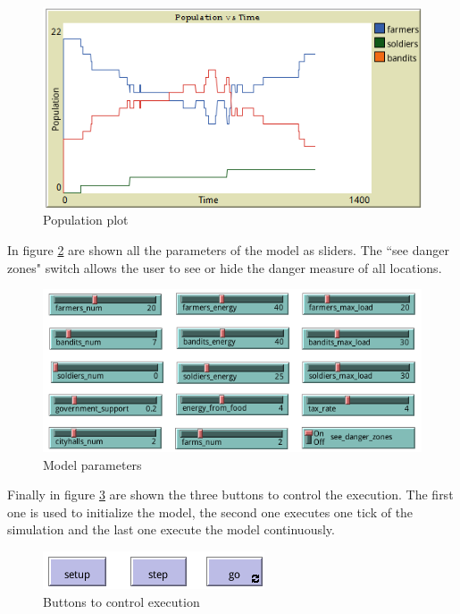 \documentclass{wscpaperproc}
\begin{document}
\begin{figure}[h!]
    \centering
    \includegraphics[scale=0.5]{Images/Population1}
    \caption{Population plot}
    \label{imp:population_plot1}
\end{figure}

In figure \ref{imp:parameters1} are shown all the parameters of the model as
sliders. The ``see danger zones" switch allows the user to see or hide the
danger measure of all locations.\\

\begin{figure}[h!]
    \centering
    \includegraphics[scale=0.5]{Images/Sliders1}
    \caption{Model parameters}
    \label{imp:parameters1}
\end{figure}

Finally in figure \ref{imp:buttons} are shown the three buttons to control the
execution. The first one is used to initialize the model, the second one
executes one tick of the simulation and the last one execute the model
continuously.

\begin{figure}[h!]
    \centering
    \includegraphics[scale=0.5]{Images/Buttons}
    \caption{Buttons to control execution}
    \label{imp:buttons}
\end{figure}
\end{document}
